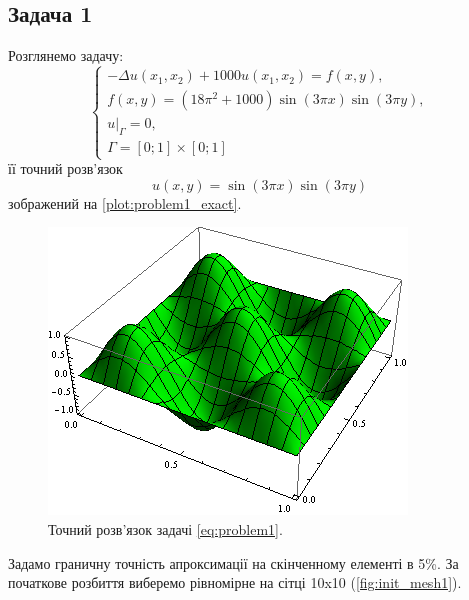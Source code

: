 
\subsection{Задача 1}

Розглянемо задачу:
\begin{equation}\label{eq:problem1}
\begin{cases}
	- \Delta u(x_1,x_2) + 1000u(x_1, x_2) = f(x,y), \\
	f(x,y) = (18 \pi^2 +1000)\sin(3 \pi x) \sin (3 \pi y), \\
	u|_\Gamma = 0 ,\\
	\Gamma = \left[0;1\right] \times \left[0;1\right]
\end{cases}
\end{equation}
її точний розв'язок
\begin{equation}
	u(x,y) = \sin(3 \pi x) \sin (3 \pi y)
\end{equation}
зображений на \autoref{plot:problem1_exact}.
\begin{figure}[H]
	\centering
    \includegraphics[scale=1.0]{problem1/ExactSolution}
    \caption{Точний розв'язок задачі \eqref{eq:problem1}.}
    \label{plot:problem1_exact}
\end{figure}
Задамо граничну точність апроксимації на скінченному елементі в 5\%.
За початкове розбиття виберемо рівномірне на сітці 10x10 (\autoref{fig:init_mesh1}).
